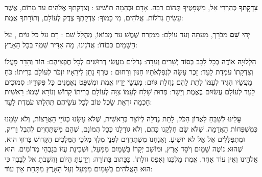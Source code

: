 
\textbf{צִדְקָתךָ} כְּהַרְרֵי אֵל, מִשְׁפָּטֶיךָ תְּהוֹם רַבָּה. אָדָם וּבְהֵמָה תוֹשִׁיעַ \Shem{}: וְצִדְקָתךָ אֱלֹהִים עַד מָרוֹם, אֲשֶׁר עָשִׂיתָ גְדֹלוֹת. אֱלֹהִים, מִי כָמוֹךָ: צִדְקָתְךָ צֶדֶק לְעוֹלָם, וְתוֹרָתךָ אֱמֶת:

\textbf{יְהִי שֵׁם} \Shem{} מבֹרָךְ, מֵעַתָּה וְעַד עוֹלָם: מִמִּזְרַח שֶׁמֶשׁ עַד מְבוֹאוֹ, מְהֻלָּל שֵׁם \Shem{}: רָם עַל כּל גּוֹיִם \Shem{}, עַל הַשָּׁמַיִם כְּבוֹדוֹ: \Shem{} אֲדֹנֵינוּ, מָה אַדִּיר שִׁמְךָ בְּכָל הָאָרֶץ:



\textbf{הַלְלוּיָהּ} אוֹדֶה \Shem{} בְּכָל לֵבָב בְּסוֹד יְשָׁרִים וְעֵדָה: גְּדֹלִים מַעֲשֵׂי \Shem{} דְּרוּשִׁים לְכָל חֶפְצֵיהֶם: הוֹד וְהָדָר פָּעֳלוֹ וְצִדְקָתוֹ עֹמֶדֶת לָעַד: זֵכֶר עָשָׂה לְנִפְלְאֹתָיו חַנּוּן וְרַחוּם \Shem{}: טֶרֶף נָתַן לִירֵאָיו יִזְכֹּר לְעוֹלָם בְּרִיתוֹ: כֹּחַ מַעֲשָׂיו הִגִּיד לְעַמּוֹ לָתֵת לָהֶם נַחֲלַת גּוֹיִם: מַעֲשֵׂי יָדָיו אֱמֶת וּמִשְׁפָּט נֶאֱמָנִים כָּל פִּקּוּדָיו: סְמוּכִים לָעַד לְעוֹלָם עֲשׂוּיִם בֶּאֱמֶת וְיָשָׁר: פְּדוּת שָׁלַח לְעַמּוֹ צִוָּה לְעוֹלָם בְּרִיתוֹ קָדוֹשׁ וְנוֹרָא שְׁמוֹ: רֵאשִׁית חָכְמָה יִרְאַת \Shem{} שֵׂכֶל טוֹב לְכָל עֹשֵׂיהֶם תְּהִלָּתוֹ עֹמֶדֶת לָעַד:



\divider


\textbf{עָ}לֵינוּ לְשַׁבֵּחַ לַאֲדוֹן הַכֹּל, לָתֵת גְּדֻלָּה לְיוֹצֵר בְּרֵאשִׁית, שֶׁלֹּא עָשָׂנוּ כְּגוֹיֵי הָאֲרָצוֹת, וְלֹא שָׂמָנוּ כְּמִשְׁפְּחוֹת הָאֲדָמָה. שֶׁלֹּא שָׂם חֶלְקֵנוּ כָּהֶם, וְלֹא גוֹרָלֵנוּ כְּכָל הֲמוֹנָם, שֶׁהֵם מִשְׁתַּחֲוִים לְהֶבֶל וָרִיק, וּמִתְפַּלְּלִים אֶל אֵל לֹא יוֹשִׁיעַ. וַאֲנַחְנוּ מִשְׁתַּחֲוִים לִפְנֵי מֶלֶךְ מַלְכֵי הַמְּלָכִים הַקָּדוֹשׁ בָּרוּךְ הוּא, שֶׁהוּא נוֹטֶה שָׁמַיִם וְיֹסֵד אָרֶץ, וּמוֹשַׁב יְקָרוֹ בַּשָּׁמַיִם מִמַּעַל, וּשְׁכִינַת עֻזּוֹ בְּגָבְהֵי מְרוֹמִים. הוּא אֱלֹהֵינוּ וְאֵין עוֹד אַחֵר, אֱמֶת מַלְכֵּנוּ וְאֶפֶס זוּלָתוֹ. כַּכָּתוּב בַּתּוֹרָה: וְיָדַעְתָּ הַיּוֹם וַהֲשֵׁבֹתָ אֶל לְבָבֶךָ כִּי \Shem{} הוּא הָאֱלֹהִים בַּשָּׁמַיִם מִמַּעַל וְעַל הָאָרֶץ מִתָּחַת אֵין עוֹ\textbf{ד}:

